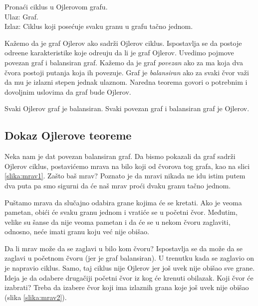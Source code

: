 \begin{problem}
	Pronaći ciklus u Ojlerovom grafu. \\
	Ulaz: Graf. \\
	Izlaz: Ciklus koji posećuje svaku granu u grafu tačno jednom.
\end{problem}

Ka\v zemo da je graf Ojlerov ako sadr\v zi Ojlerov ciklus. Ispostavlja se da postoje odre\dj ene karakteristike koje odre\dj uju da li je graf Ojlerov. Uvedimo pojmove povezan graf i balansiran graf. Kažemo da je graf \emph{povezan} ako za ma koja dva čvora postoji putanja koja ih povezuje. Graf je \emph{balansiran} ako za svaki čvor važi da mu je izlazni stepen jednak ulaznom. Naredna teorema govori o potrebnim i dovoljnim uslovima da graf bude Ojlerov.

\begin{teorema}
	Svaki Ojlerov graf je balansiran. Svaki povezan graf i balansiran graf je Ojlerov.
\end{teorema}

\subsection{Dokaz Ojlerove teoreme}

Neka nam je dat povezan balansiran graf. Da bismo pokazali da graf sadrži Ojlerov ciklus, postavićemo mrava na bilo koji od čvorova tog grafa, kao na slici \ref{slika:mrav1}. Zašto baš mrav? Poznato je da mravi nikada ne idu istim putem dva puta pa smo sigurni da će naš mrav proći dvaku granu tačno jednom.

Puštamo mrava da slučajno odabira grane kojima će se kretati. Ako je veoma pametan, obići će svaku granu jednom i vratiće se u početni čvor. Međutim, velike su šanse da nije veoma pametan i da će se u nekom čvoru zaglaviti, odnosno, neće imati granu koju već nije obišao.

Da li mrav može da se zaglavi u bilo kom čvoru? Ispostavlja se da može da se zaglavi u početnom čvoru (jer je graf balansiran). U trenutku kada se zaglavio on je napravio ciklus. Samo, taj ciklus nije Ojlerov jer još uvek nije obišao sve grane. Ideja je da odabere drugačiji početni čvor iz kog će krenuti obilazak. Koji čvor će izabrati? Treba da izabere čvor koji ima izlaznih grana koje još uvek nije obišao (slika \ref{slika:mrav2}). 

